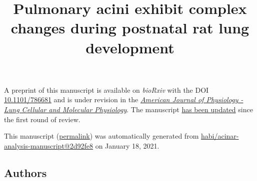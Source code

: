 \documentclass[
  american,
]{article}
\title{Pulmonary acini exhibit complex changes during postnatal rat lung development}
\author{}
\date{}
\begin{document}
\maketitle

A preprint of this manuscript is available on \emph{bioRxiv} with the DOI \href{https://doi.org/10.1101/786681}{10.1101/786681} and is under revision in the \href{https://journals.physiology.org/journal/ajplung}{\emph{American Journal of Physiology - Lung Cellular and Molecular Physiology}}.
The manuscript \href{https://github.com/habi/acinar-analysis-manuscript/compare/d6fc17bd66bdca5cbff30d53e1dbc02d5351609b...2d92fe82c37a25398347cedd39e1de9ed0aa58f2}{has been updated} since the first round of review.

This manuscript
(\href{https://habi.github.io/acinar-analysis-manuscript/v/2d92fe82c37a25398347cedd39e1de9ed0aa58f2/}{permalink})
was automatically generated
from \href{https://github.com/habi/acinar-analysis-manuscript/tree/2d92fe82c37a25398347cedd39e1de9ed0aa58f2}{habi/acinar-analysis-manuscript@2d92fe8}
on January 18, 2021.

\hypertarget{authors}{%
\subsection{Authors}\label{authors}}
\end{document}
